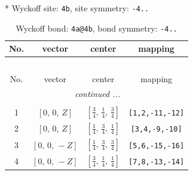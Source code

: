 \documentclass[fleqn,8pt]{jsarticle}
\begin{document}
* Wyckoff site: {\tt 4b}, site symmetry: {\tt -4..}
\renewcommand{\arraystretch}{1.2}
\begin{longtable}{cccc}
\caption{Wyckoff bond: {\tt 4a@4b}, bond symmetry: {\tt -4..}}
 \\
 \hline \hline
No. & vector & center & mapping \\ \hline \endfirsthead

\multicolumn{3}{l}{\tablename\ \thetable{}} \\
 \hline \hline
No. & vector & center & mapping \\ \hline \endhead

 \hline \hline
\multicolumn{3}{r}{\footnotesize\it continued ...} \\ \endfoot

 \hline \hline
\multicolumn{3}{r}{} \\ \endlastfoot

1 & $\left[ 0,\, 0,\, Z \right]$ & $\left[ \frac{3}{4},\, \frac{1}{4},\, \frac{3}{4} \right]$ & {\tt [1,2,-11,-12]} \\ \hline
2 & $\left[ 0,\, 0,\, Z \right]$ & $\left[ \frac{1}{4},\, \frac{3}{4},\, \frac{1}{4} \right]$ & {\tt [3,4,-9,-10]} \\ \hline
3 & $\left[ 0,\, 0,\, - Z \right]$ & $\left[ \frac{1}{4},\, \frac{3}{4},\, \frac{3}{4} \right]$ & {\tt [5,6,-15,-16]} \\ \hline
4 & $\left[ 0,\, 0,\, - Z \right]$ & $\left[ \frac{3}{4},\, \frac{1}{4},\, \frac{1}{4} \right]$ & {\tt [7,8,-13,-14]} \\
\end{longtable}
\renewcommand{\arraystretch}{1.2}
\end{document}
